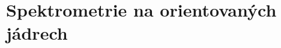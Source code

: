 \documentclass[../../main.tex]{subfiles}
\begin{document}
\section{Spektrometrie na orientovaných jádrech}
\end{document}
